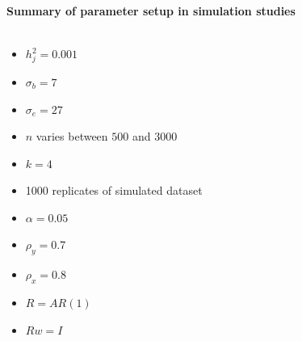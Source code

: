 \documentclass[compress]{beamer}
\begin{document}

\framebreak
\textbf{Summary of parameter setup in simulation studies}\\\

\begin{itemize}
\item $h_j^2 = 0.001$
\item $\sigma_b = 7$
\item $\sigma_e = 27$
\item $n$ varies between $500$ and $3000$ 
\item $k = 4$
\item 1000 replicates of simulated dataset
\item $\alpha = 0.05$
\item $\rho_y = 0.7$
\item $\rho_x = 0.8$
\item $R = AR(1)$
\item $Rw = I$
\end{itemize}
\end{document}
